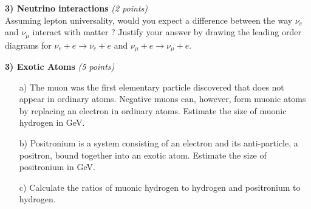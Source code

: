 {\textbf{3) Neutrino interactions } \hfill \textit{(2 points)}\\
Assuming lepton universality, would you expect a difference between the way $\nu_e$ and $\nu_\mu$ interact with matter ?
Justify your answer by drawing the leading order diagrams for $\nu_e + e \rightarrow \nu_e + e$  and $\nu_\mu + e \rightarrow \nu_\mu + e$.

\vspace*{0.25in}




\textbf{3) Exotic Atoms } \hfill \textit{(5 points)}\\
\begin{itemize}
\item[a)]{
The muon was the first elementary particle discovered that does not appear in ordinary atoms.
Negative muons can, however, form muonic atoms by replacing an electron in ordinary atoms. 
Estimate the size of muonic hydrogen in GeV.  
}
\item[b)]{
Positronium is a system consisting of an electron and its anti-particle, a positron, bound together into an exotic atom.
Estimate the size of positronium in GeV. 
}
\item[c)]{
Calculate the ratios of muonic hydrogen to hydrogen and positronium to hydrogen.
}
\end{itemize}


} %

